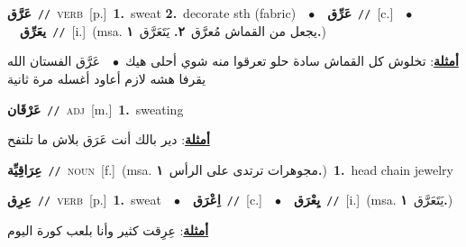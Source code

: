 \documentclass[10pt,a4paper,twoside]{article} %
\begin{document}
\begin{multicols}{2}
{\setlength\topsep{0pt}\textbf{\foreignlanguage{arabic}{عَرَّق}}\ {\color{gray}\texttt{//}\color{black}}\ \textsc{verb}\ [p.]\ \textbf{1.}~sweat  \textbf{2.}~decorate sth (fabric)\ \ $\bullet$\ \ \setlength\topsep{0pt}\textbf{\foreignlanguage{arabic}{عَرِّق}}\ {\color{gray}\texttt{//}\color{black}}\ [c.]\ \ $\bullet$\ \ \setlength\topsep{0pt}\textbf{\foreignlanguage{arabic}{يعَرِّق}}\ {\color{gray}\texttt{//}\color{black}}\ [i.]\ \color{gray}(msa. \foreignlanguage{arabic}{يجعل من القماش مُعرَّق}~\foreignlanguage{arabic}{\textbf{٢.}}  \foreignlanguage{arabic}{يَتَعَرَّق}~\foreignlanguage{arabic}{\textbf{١.}})\color{black}\  \begin{flushright}\color{gray}\foreignlanguage{arabic}{\textbf{\underline{\foreignlanguage{arabic}{أمثلة}}}: تخلوش كل القماش سادة حلو تعرقوا منه شوي أحلى هيك\ $\bullet$\ \  عَرَّق الفستان الله يقرفا هشه لازم أعاود أغسله مرة ثانية}\end{flushright}\color{black}} \vspace{2mm}

{\setlength\topsep{0pt}\textbf{\foreignlanguage{arabic}{عَرْقَان}}\ {\color{gray}\texttt{//}\color{black}}\ \textsc{adj}\ [m.]\ \textbf{1.}~sweating\  \begin{flushright}\color{gray}\foreignlanguage{arabic}{\textbf{\underline{\foreignlanguage{arabic}{أمثلة}}}: دير بالك أنت عَرَق بلاش ما تلتفح}\end{flushright}\color{black}} \vspace{2mm}

{\setlength\topsep{0pt}\textbf{\foreignlanguage{arabic}{عِرَاقِيِّة}}\ {\color{gray}\texttt{//}\color{black}}\ \textsc{noun}\ [f.]\ \color{gray}(msa. \foreignlanguage{arabic}{مجوهرات ترتدى على الرأس}~\foreignlanguage{arabic}{\textbf{١.}})\color{black}\ \textbf{1.}~head chain jewelry\ } \vspace{2mm}

{\setlength\topsep{0pt}\textbf{\foreignlanguage{arabic}{عِرِق}}\ {\color{gray}\texttt{//}\color{black}}\ \textsc{verb}\ [p.]\ \textbf{1.}~sweat\ \ $\bullet$\ \ \setlength\topsep{0pt}\textbf{\foreignlanguage{arabic}{اِعْرَق}}\ {\color{gray}\texttt{//}\color{black}}\ [c.]\ \ $\bullet$\ \ \setlength\topsep{0pt}\textbf{\foreignlanguage{arabic}{يِعْرَق}}\ {\color{gray}\texttt{//}\color{black}}\ [i.]\ \color{gray}(msa. \foreignlanguage{arabic}{يَتَعَرَّق}~\foreignlanguage{arabic}{\textbf{١.}})\color{black}\  \begin{flushright}\color{gray}\foreignlanguage{arabic}{\textbf{\underline{\foreignlanguage{arabic}{أمثلة}}}: عِرِقت كثير وأنا بلعب كورة اليوم}\end{flushright}\color{black}} \vspace{2mm}


\end{multicols}
\end{document}
